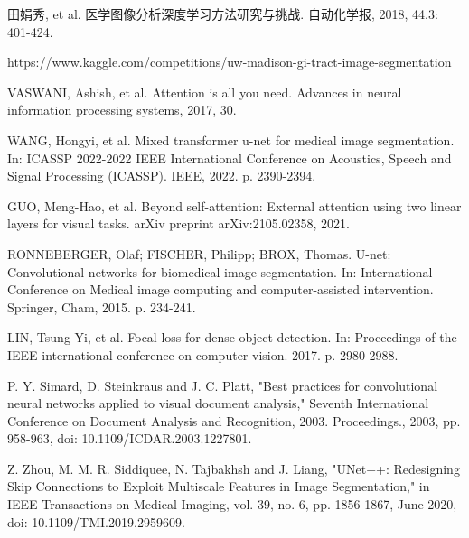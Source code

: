 \documentclass[letterpaper, 10pt, conference, twoside]{ieeeconf}
\begin{document}
\begin{thebibliography}{99}

田娟秀, et al. 医学图像分析深度学习方法研究与挑战. 自动化学报, 2018, 44.3: 401-424.

https://www.kaggle.com/competitions/uw-madison-gi-tract-image-segmentation

VASWANI, Ashish, et al. Attention is all you need. Advances in neural information processing systems, 2017, 30.

WANG, Hongyi, et al. Mixed transformer u-net for medical image segmentation. In: ICASSP 2022-2022 IEEE International Conference on Acoustics, Speech and Signal Processing (ICASSP). IEEE, 2022. p. 2390-2394.

GUO, Meng-Hao, et al. Beyond self-attention: External attention using two linear layers for visual tasks. arXiv preprint arXiv:2105.02358, 2021.

RONNEBERGER, Olaf; FISCHER, Philipp; BROX, Thomas. U-net: Convolutional networks for biomedical image segmentation. In: International Conference on Medical image computing and computer-assisted intervention. Springer, Cham, 2015. p. 234-241.

LIN, Tsung-Yi, et al. Focal loss for dense object detection. In: Proceedings of the IEEE international conference on computer vision. 2017. p. 2980-2988.

P. Y. Simard, D. Steinkraus and J. C. Platt, "Best practices for convolutional neural networks applied to visual document analysis," Seventh International Conference on Document Analysis and Recognition, 2003. Proceedings., 2003, pp. 958-963, doi: 10.1109/ICDAR.2003.1227801.

Z. Zhou, M. M. R. Siddiquee, N. Tajbakhsh and J. Liang, "UNet++: Redesigning Skip Connections to Exploit Multiscale Features in Image Segmentation," in IEEE Transactions on Medical Imaging, vol. 39, no. 6, pp. 1856-1867, June 2020, doi: 10.1109/TMI.2019.2959609.


\end{thebibliography}
\end{document}
